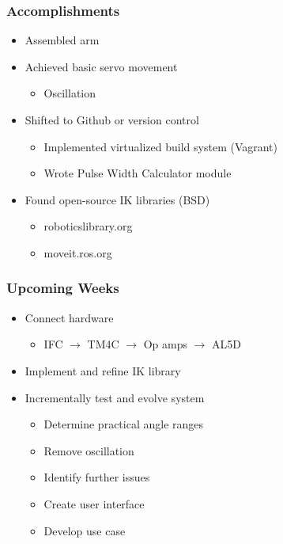 \documentclass[10pt, compress]{beamer}
\begin{document}
\begin{frame}[fragile]
  \frametitle{Accomplishments}
  \begin{itemize}
    \item Assembled arm
    \item Achieved basic servo movement
      \begin{itemize}[label=$\circ$]
        \item Oscillation
      \end{itemize}
    \item Shifted to Github or version control
      \begin{itemize}[label=$\circ$]
        \item Implemented virtualized build system (Vagrant)
        \item Wrote Pulse Width Calculator module
      \end{itemize}
    \item Found open-source IK libraries (BSD)
      \begin{itemize}[label=$\circ$]
        \item roboticslibrary.org
        \item moveit.ros.org
      \end{itemize}
  \end{itemize}
\end{frame}

\begin{frame}[fragile]
  \frametitle{Upcoming Weeks}
  \begin{itemize}
    \item Connect hardware
      \begin{itemize}[label=$\circ$]
        \item IFC $\to$ TM4C $\to$ Op amps $\to$ AL5D
      \end{itemize}
    \item Implement and refine IK library
    \item Incrementally test and evolve system
      \begin{itemize}[label=$\circ$]
        \item Determine practical angle ranges
        \item Remove oscillation
        \item Identify further issues
        \item Create user interface
        \item Develop use case
      \end{itemize}
  \end{itemize}
\end{frame}
\end{document}
